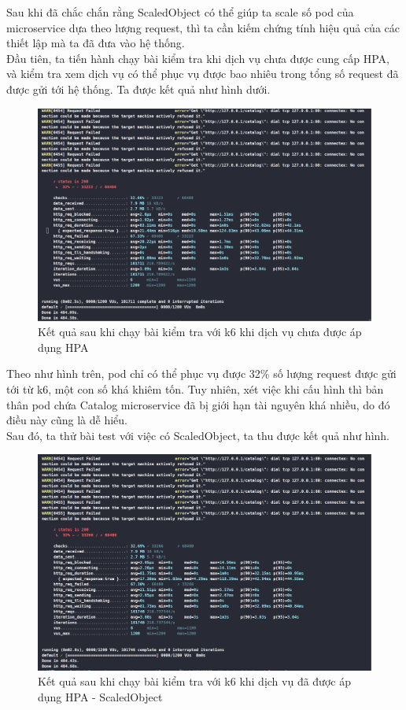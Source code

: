 \noindent Sau khi đã chắc chắn rằng ScaledObject có thể giúp ta scale số pod của microservice dựa theo lượng request, thì ta cần kiếm chứng tính hiệu quả của các thiết lập mà ta đã đưa vào hệ thống.\\[0.5cm]
Đầu tiên, ta tiến hành chạy bài kiểm tra khi dịch vụ chưa được cung cấp HPA, và kiểm tra xem dịch vụ có thể phục vụ được bao nhiêu trong tổng số request đã được gửi tới hệ thống. Ta được kết quả như hình dưới.
\begin{figure}[H]
  \begin{center}
    \includegraphics[scale=0.44]{images/hanh/test-without-hpa.png}
    \caption{Kết quả sau khi chạy bài kiểm tra với k6 khi dịch vụ chưa được áp dụng HPA}
  \end{center}
  \label{}
\end{figure}
Theo như hình trên, pod chỉ có thể phục vụ được 32\% số lượng request được gửi tới từ k6, một con số khá khiêm tốn. Tuy nhiên, xét việc khi cấu hình thì bản thân pod chứa Catalog microservice đã bị giới hạn tài nguyên khá nhiều, do đó điều này cũng là dễ hiểu.\\[0.5cm]
Sau đó, ta thử bài test với việc có ScaledObject, ta thu được kết quả như hình.
\begin{figure}[H]
  \begin{center}
    \includegraphics[scale=0.44]{images/hanh/test-with-hpa.png}
    \caption{Kết quả sau khi chạy bài kiểm tra với k6 khi dịch vụ đã được áp dụng HPA - ScaledObject}
  \end{center}
  \label{}
\end{figure}
